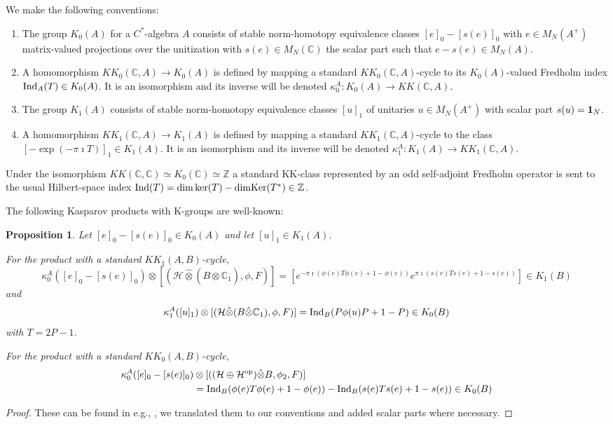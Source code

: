 \documentclass[12pt]{amsart}
\newtheorem{proposition}[theorem]{Proposition}
\newcommand{\CM}{{\mathbb C}}
\newcommand{\ZM}{{\mathbb Z}}
\newcommand{\Hh}{{\mathcal H}}
\newcommand{\one}{{\bf 1}}
\newcommand{\Ind}{{\rm Ind}}
\newcommand{\Ker}{{\rm Ker}}
\begin{document}
We make the following conventions:
\begin{enumerate}
\item The group $K_0(A)$ for a $C^*$-algebra $A$ consists of stable norm-homotopy equivalence classes $[e]_0-[s(e)]_0$
with $e\in M_N(A^+)$ matrix-valued projections over the unitization with $s(e)\in M_N(\CM)$ the scalar part such that $e-s(e)\in M_N(A)$. 

\item A homomorphism $KK_0(\CM,A)\to K_0(A)$ is defined by mapping a standard $KK_0(\CM,A)$-cycle to its $K_0(A)$-valued Fredholm index $\Ind_A(T)\in K_0(A)$. It is an isomorphism and its inverse will be denoted $\kappa_0^A: K_0(A)\to KK(\CM,A)$.

\item The group $K_1(A)$ consists of stable norm-homotopy equivalence classes $[u]_1$ of unitaries $u\in M_N(A^+)$ with scalar part $s(u)=\one_N$.

\item A homomorphism $KK_1(\CM,A)\to K_1(A)$ is defined by mapping a standard $KK_1(\CM,A)$-cycle to the class $[-\exp(-\pi \imath T)]_1\in K_1(A)$. It is an isomorphism and its inverse will be denoted $\kappa_1^A: K_1(A)\to KK_1(\CM,A)$.
\end{enumerate}
Under the isomorphism $KK(\CM,\CM)\simeq K_0(\CM) \simeq \ZM$ a standard KK-class represented by an odd self-adjoint Fredholm operator is sent to the usual Hilbert-space index $\Ind(T)=\mathrm{dim}\ker(T)-\mathrm{dim}\Ker(T^*) \in \ZM$.

The following Kasparov products with K-groups are well-known:
\begin{proposition}
\label{prop:basic_products}
Let $[e]_0-[s(e)]_0\in K_0(A)$ and let $[u]_1\in K_1(A)$. 

For the product with a standard $KK_1(A,B)$-cycle,
$$\kappa^A_0([e]_0-[s(e)]_0) \otimes [(\Hh\hat{\otimes}(B\hat{\otimes}\CM_1), \phi, F)]= [e^{-\pi \imath (\phi(e) T \phi(e)+1-\phi(e))}e^{\pi \imath (s(e) T s(e)+1-s(e))}] \in K_1(B)$$
and
$$\kappa^A_1([u]_1) \otimes [(\Hh\hat{\otimes}(B\hat{\otimes}\CM_1), \phi, F)]= \Ind_B(P \phi(u)P+1-P) \in K_0(B)$$
with $T=2P-1$.

For the product with a standard $KK_0(A,B)$-cycle,
\begin{align*}
\kappa^A_0([e]_0-[s(e)]_0) &\otimes [((\Hh\oplus \Hh^{\mathrm{op}})\hat{\otimes} B, \phi_2, F)]\\
&= \Ind_B(\phi(e) T \phi(e) + 1-\phi(e))- \Ind_B(s(e) T s(e) + 1-s(e))  \in K_0(B)
\end{align*}

\end{proposition}
\begin{proof}
These can be found in e.g., \cite[Proposition 5.28-31]{ProdanSchulzBaldes2016B},  we translated them to our conventions and added scalar parts where necessary.
\end{proof}
\end{document}
